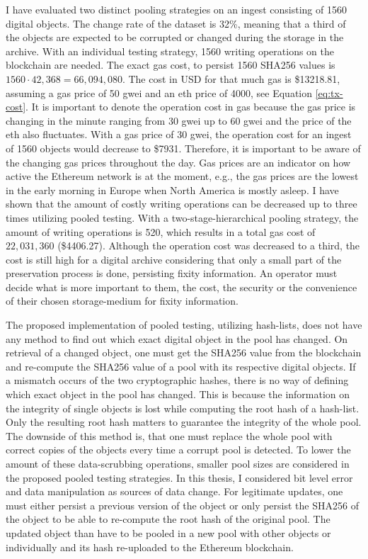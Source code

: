 I have evaluated two distinct pooling strategies on an ingest consisting of 1560 digital objects. The change rate of the dataset is 32\%, meaning that a third of the objects are expected to be corrupted or changed during the storage in the archive. With an individual testing strategy, 1560 writing operations on the blockchain are needed. The exact gas cost, to persist 1560 SHA256 values is $1560 \cdot 42,368 = 66,094,080$. The cost in USD for that much gas is \$13218.81, assuming a gas price of 50 \acrlong{gwei} and an \acrlong{eth} price of 4000, see Equation \ref{eq:tx-cost}. It is important to denote the operation cost in gas because the gas price is changing in the minute ranging from 30 \acrlong{gwei} up to 60 \acrlong{gwei} and the price of the \acrlong{eth} also fluctuates. With a gas price of 30 \acrlong{gwei}, the operation cost for an ingest of 1560 objects would decrease to \$7931.
Therefore, it is important to be aware of the changing gas prices throughout the day. Gas prices are an indicator on how active the Ethereum network is at the moment, e.g., the gas prices are the lowest in the early morning in Europe when North America is mostly asleep.
I have shown that the amount of costly writing operations can be decreased up to three times utilizing pooled testing. With a two-stage-hierarchical pooling strategy, the amount of writing operations is 520, which results in a total gas cost of $22,031,360$ (\$4406.27).
Although the operation cost was decreased to a third, the cost is still high for a digital archive considering that only a small part of the preservation process is done, persisting fixity information. An operator must decide what is more important to them, the cost, the security or the convenience of their chosen storage-medium for fixity information. 

The proposed implementation of pooled testing, utilizing hash-lists, does not have any method to find out which exact digital object in the pool has changed. On retrieval of a changed object, one must get the SHA256 value from the blockchain and re-compute the SHA256 value of a pool with its respective digital objects. If a mismatch occurs of the two cryptographic hashes, there is no way of defining which exact object in the pool has changed. This is because the information on the integrity of single objects is lost while computing the root hash of a hash-list. Only the resulting root hash matters to guarantee the integrity of the whole pool. The downside of this method is, that one must replace the whole pool with correct copies of the objects every time a corrupt pool is detected. To lower the amount of these data-scrubbing operations, smaller pool sizes are considered in the proposed pooled testing strategies.
In this thesis, I considered bit level error and data manipulation as sources of data change. For legitimate updates, one must either persist a previous version of the object or only persist the SHA256 of the object to be able to re-compute the root hash of the original pool. The updated object than have to be pooled in a new pool with other objects or individually and its hash re-uploaded to the Ethereum blockchain.

